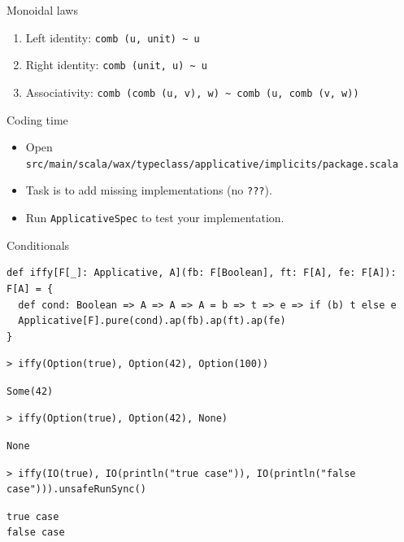 \documentclass[presentation,aspectratio=169,smaller]{beamer}
\begin{document}
\begin{frame}[label={sec:org360b968},fragile]{Monoidal laws}
 \begin{enumerate}
\item Left identity: \texttt{comb (u, unit) \textasciitilde{} u}
\item Right identity: \texttt{comb (unit, u) \textasciitilde{} u}
\item Associativity: \texttt{comb (comb (u, v), w) \textasciitilde{} comb (u, comb (v, w))}
\end{enumerate}
\end{frame}

\begin{frame}[label={sec:orgc89224a},fragile]{Coding time}
 \begin{itemize}
\item Open \texttt{src/main/scala/wax/typeclass/applicative/implicits/package.scala}
\item Task is to add missing implementations (no \texttt{???}).
\item Run \texttt{ApplicativeSpec} to test your implementation.
\end{itemize}
\end{frame}

\begin{frame}[label={sec:org283f049},fragile]{Conditionals}
 \begin{verbatim}
def iffy[F[_]: Applicative, A](fb: F[Boolean], ft: F[A], fe: F[A]): F[A] = {
  def cond: Boolean => A => A => A = b => t => e => if (b) t else e
  Applicative[F].pure(cond).ap(fb).ap(ft).ap(fe)
}
\end{verbatim}

\pause

\begin{verbatim}
> iffy(Option(true), Option(42), Option(100))
\end{verbatim}

\pause

\begin{verbatim}
Some(42)
\end{verbatim}

\pause

\begin{verbatim}
> iffy(Option(true), Option(42), None)
\end{verbatim}

\pause

\begin{verbatim}
None
\end{verbatim}

\pause

\begin{verbatim}
> iffy(IO(true), IO(println("true case")), IO(println("false case"))).unsafeRunSync()
\end{verbatim}

\pause

\begin{verbatim}
true case
false case
\end{verbatim}
\end{frame}
\end{document}
